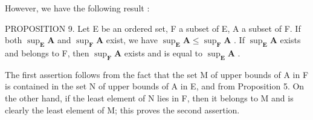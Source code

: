 However, we have the following result :

PROPOSITION 9. Let E be an ordered set, F a subset of E, A a subset of F. If both \(\sup_{\mathbf{E}}\mathbf{A}\) and \(\sup_{\mathbf{F}}\mathbf{A}\) exist, we have \(\sup_{\mathbf{E}}\mathbf{A} \leqslant \sup_{\mathbf{F}}\mathbf{A}\) . If \(\sup_{\mathbf{E}}\mathbf{A}\) exists and belongs to F, then \(\sup_{\mathbf{F}}\mathbf{A}\) exists and is equal to \(\sup_{\mathbf{E}}\mathbf{A}\) .

The first assertion follows from the fact that the set M of upper bounds of A in F is contained in the set N of upper bounds of A in E, and from Proposition 5. On the other hand, if the least element of N lies in F, then it belongs to M and is clearly the least element of M; this proves the second assertion.

